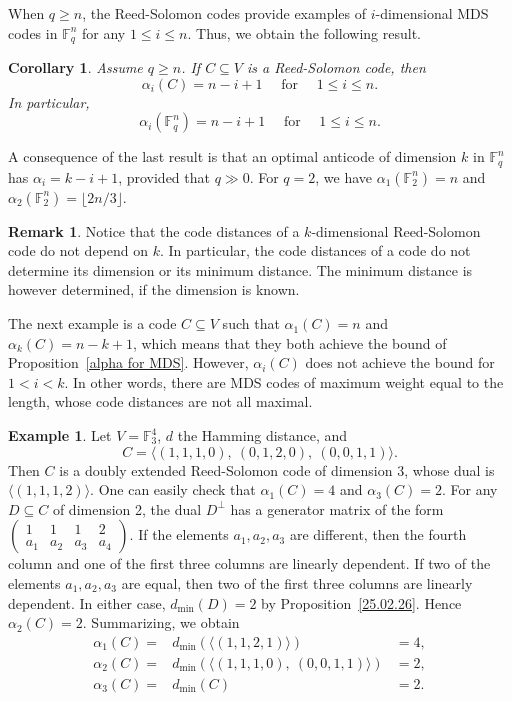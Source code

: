 \documentclass[12pt]{amsart}
\numberwithin{equation}{section}
\newtheorem{corollary}[theorem]{Corollary}
\theoremstyle{definition}
\newtheorem{remark}[theorem]{Remark}
\newtheorem{example}[theorem]{Example}
\newcommand{\FF}{\mathbb{F}}
\begin{document}
When $q\geq n$, the Reed-Solomon codes provide examples of $i$-dimensional MDS codes in $\FF_q^n$ for any $1\leq i\leq n$. Thus, we obtain the following result.

\begin{corollary}\label{alpha RS code}
Assume $q \geq n$. If $C \subseteq V$ is a Reed-Solomon code, then
\[\alpha_i(C)=n-i+1 \quad \text{ for } \quad 1\leq i\leq n.\]
 In particular,
 \[\alpha_i(\FF_q^n)=n-i+1 \quad \text{ for } \quad 1\leq i\leq n.\]
\end{corollary}

A consequence of the last result is that an optimal anticode of dimension $k$ in $\FF_q^n$ has $\alpha_i=k-i+1$, provided that $q\gg 0$. For $q=2$, we have $\alpha_1(\FF_2^n)=n$ and $\alpha_2(\FF_2^n)=\lfloor 2n/3 \rfloor$.

\begin{remark}\label{25.03.05}
Notice that the code distances of a $k$-dimensional Reed-Solomon code do not depend on $k$. In particular, the code distances of a code do not determine its dimension or its minimum distance. The minimum distance is however determined, if the dimension is known.
\end{remark}

The next example is a code $C \subseteq V$ such that $\alpha_1(C)=n$ and $\alpha_k(C)=n-k+1$, which means that they both achieve the bound of Proposition~\ref{alpha for MDS}. However, $\alpha_i(C)$ does not achieve the bound for $1 < i < k$. In other words, there are MDS codes of maximum weight equal to the length, whose code distances are not all maximal. %

\begin{example}\label{ex:ternary422}
Let $V=\mathbb{F}_3^4$, $d$ the Hamming distance, and  
\[C=\langle (1,1,1,0),\ (0,1,2,0),\ (0,0,1,1)\rangle.\]
Then $C$ is a doubly extended Reed-Solomon code of dimension 3, whose dual is $\langle (1,1,1,2)\rangle$. One can easily check that $\alpha_1(C)=4$ and $\alpha_3(C)=2$. For any $D\subseteq C$ of dimension 2, the dual $D^\perp$ has a generator matrix of the form
$\begin{pmatrix}
1&1&1&2\\
a_1&a_2&a_3&a_4
\end{pmatrix}.$
If the elements $a_1,a_2,a_3$ are different, then the fourth column and one of the first three columns are linearly dependent. If two of the elements $a_1,a_2,a_3$ are equal, then two of the first three columns are linearly dependent. In either case, $d_{\min}(D)=2$ by Proposition~\ref{25.02.26}. Hence $\alpha_2(C)=2$.
Summarizing, we obtain
$$\begin{array}{ccc}
\alpha_1(C)=&d_{\min}(\langle (1,1,2,1)\rangle)&=4,\\
\alpha_2(C)=&d_{\min}(\langle (1,1,1,0),\ (0,0,1,1)\rangle)&=2,\\
\alpha_3(C)=&d_{\min}(C)&=2.
\end{array}$$
\end{example}
\end{document}
